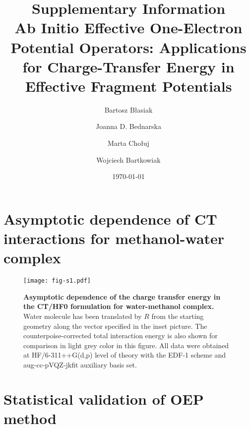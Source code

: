 \documentclass[aip,jcp,amsmath,amssymb,preprint,floatfix]{revtex4-1}
\begin{document}

\renewcommand{\thefigure}{S\arabic{figure}}
\setcounter{figure}{0}

\title{Supplementary Information\\Ab Initio Effective One-Electron Potential Operators:
Applications for Charge-Transfer Energy in Effective Fragment Potentials}

\author{Bartosz B{\l}asiak}

\author{Joanna D. Bednarska}
\author{Marta Cho{\l}uj} 
\author{Wojciech Bartkowiak}


\date{\today}

\pacs{}

\maketitle

\tableofcontents

\section{Asymptotic dependence of CT interactions for methanol-water complex}

%
\begin{figure}[h]
\texttt{[image: fig-s1.pdf]}
\caption{\label{f:fig-s1} {\bf Asymptotic dependence of the charge transfer energy
in the CT/HF0 formulation for water-methanol complex.} 
Water molecule has been translated by $R$ from the starting geometry
along the vector specified in the inset picture.
The counterpoise\hyp{}corrected total interaction energy
is also shown for comparison in light grey color in this figure.
All data were obtained at HF/6-311++G(d,p) level of theory
with the EDF-1 scheme and aug-cc-pVQZ-jkfit auxiliary basis set.
} 
\end{figure}
%


\section{Statistical validation of OEP method}
\end{document}

